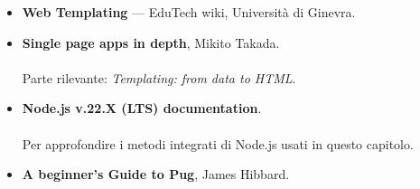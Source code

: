 \begin{itemize}
  \item \textbf{Web Templating} --- EduTech wiki, Università di Ginevra. \\
  \item \textbf{Single page apps in depth}, Mikito Takada. \\
         \\
        Parte rilevante: \textit{Templating: from data to HTML}.
  \item \textbf{Node.js v.22.X (LTS) documentation}. \\
         \\
        Per approfondire i metodi integrati di Node.js usati in questo capitolo.
  \item \textbf{A beginner's Guide to Pug}, James Hibbard. \\
\end{itemize}
